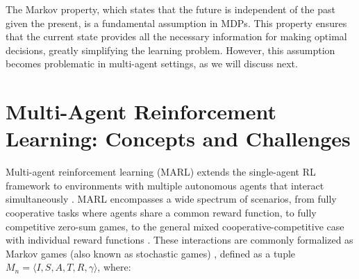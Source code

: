 \documentclass[a4paper,12pt]{report}
\begin{document}
The Markov property, which states that the future is independent of the past given the present, is a fundamental assumption in MDPs. This property ensures that the current state provides all the necessary information for making optimal decisions, greatly simplifying the learning problem. However, this assumption becomes problematic in multi-agent settings, as we will discuss next.

\section{Multi-Agent Reinforcement Learning: Concepts and Challenges}

Multi-agent reinforcement learning (MARL) extends the single-agent RL framework to environments with multiple autonomous agents that interact simultaneously \cite{marl-book,yang2020overview, huh2024multiagentreinforcementlearningcomprehensive, busoniu2010multi, zhang2021multi}. MARL encompasses a wide spectrum of scenarios, from fully cooperative tasks where agents share a common reward function, to fully competitive zero-sum games, to the general mixed cooperative-competitive case with individual reward functions \cite{nowé2012game}. These interactions are commonly formalized as Markov games (also known as stochastic games) \cite{littman1994markov, shapley1953stochastic}, defined as a tuple $M_n = \langle I, S, A, T, R, \gamma \rangle$, where:
\end{document}

